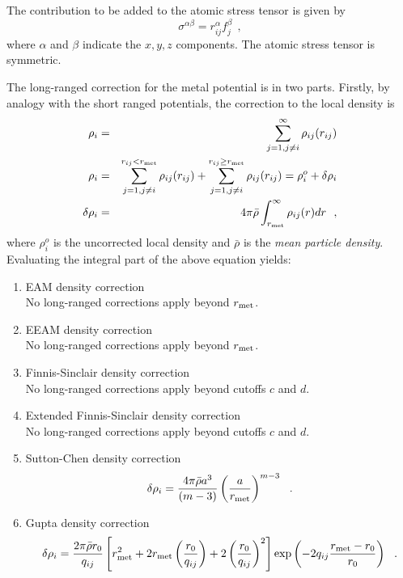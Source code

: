 The contribution to be added to the atomic stress tensor is
given by
\begin{equation}
\sigma^{\alpha \beta} = r_{ij}^{\alpha} f_{j}^{\beta}~~,
\end{equation}
where $\alpha$ and $\beta$ indicate the $x,y,z$ components.  The
atomic stress tensor is symmetric.

The long-ranged correction
for the \D metal potential is in two parts.  Firstly, by analogy
with the short ranged potentials, the correction to the
local density is
\begin{eqnarray}
\rho_{i} &=& \sum_{j=1, j \ne i}^{\infty} \rho_{ij}(r_{ij}) \nonumber \\
\rho_{i} &=& \sum_{j=1, j \ne i}^{r_{ij}<r_{\rm met}} \rho_{ij}(r_{ij}) +
\sum_{j=1, j \ne i}^{r_{ij} \ge r_{\rm met}} \rho_{ij}(r_{ij}) =
\rho_{i}^{o} + \delta \rho_{i} \\
\delta \rho_{i} &=& 4 \pi \bar{\rho} \int_{r_{\rm met}}^{\infty} \rho_{ij}(r) dr~~, \nonumber
\end{eqnarray}
where $\rho_{i}^{o}$ is the uncorrected local density and
$\bar{\rho}$ is the {\em mean particle density}.  Evaluating the
integral part of the above equation yields:
\begin{enumerate}
\item EAM density correction \\
No long-ranged corrections apply beyond $r_{\rm met}$.
\item EEAM density correction \\
No long-ranged corrections apply beyond $r_{\rm met}$.
\item Finnis-Sinclair density correction \\
No long-ranged corrections apply beyond cutoffs $c$ and $d$.
\item Extended Finnis-Sinclair density correction \\
No long-ranged corrections apply beyond cutoffs $c$ and $d$.
\item Sutton-Chen density correction
\begin{eqnarray}
\delta \rho_{i} = \frac{4 \pi \bar{\rho} a^{3}}{(m-3)}
\left( \frac{a}{r_{\rm met}} \right)^{m-3}~~.
\end{eqnarray}
\item Gupta density correction
\begin{eqnarray}
\delta \rho_{i} = \frac{2 \pi \bar{\rho} r_{0}}{q_{ij}}
\left[ r_{\rm met}^{2} + 2 r_{\rm met} \left(\frac{r_{0}}{q_{ij}}\right) +
2 \left(\frac{r_{0}}{q_{ij}}\right)^{2} \right]
\exp \left( -2 q_{ij} \frac{r_{\rm met}-r_{0}}{r_{0}}\right)~~.
\end{eqnarray}
\end{enumerate}

